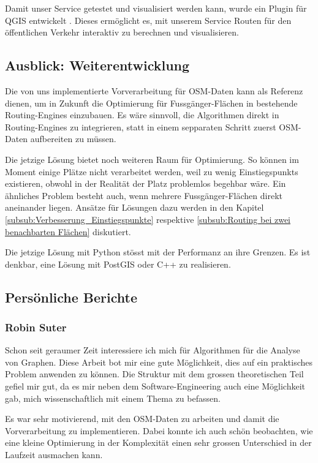 Damit unser Service getestet und visualisiert werden kann, wurde ein Plugin für QGIS entwickelt \cite{github:PlazaRoute-qgis-plugin}. Dieses ermöglicht es, mit unserem Service Routen für den öffentlichen Verkehr interaktiv zu berechnen und visualisieren.

\subsection{Ausblick: Weiterentwicklung}
\label{sub:Ausblick: Weiterentwicklung}

Die von uns implementierte Vorverarbeitung für \ac{OSM}-Daten kann als Referenz dienen, um in Zukunft die Optimierung für Fussgänger-Flächen in bestehende Routing-Engines einzubauen. Es wäre sinnvoll, die Algorithmen direkt in Routing-Engines zu integrieren, statt in einem sepparaten Schritt zuerst \ac{OSM}-Daten aufbereiten zu müssen.

Die jetzige Lösung bietet noch weiteren Raum für Optimierung. So können im Moment einige Plätze nicht verarbeitet werden, weil zu wenig \glspl{Einstiegspunkt} existieren, obwohl in der Realität der Platz problemlos begehbar wäre. Ein ähnliches Problem besteht auch, wenn mehrere Fussgänger-Flächen direkt aneinander liegen. Ansätze für Lösungen dazu werden in den Kapitel \ref{subsub:Verbesserung_Einstiegspunkte} respektive \ref{subsub:Routing bei zwei benachbarten Flächen} diskutiert.

Die jetzige Lösung mit Python stösst mit der Performanz an ihre Grenzen. Es ist denkbar, eine Lösung mit PostGIS oder C++ zu realisieren.

\subsection{Persönliche Berichte}
\label{sub:Persönliche Berichte}

\subsubsection{Robin Suter}
\label{Persönliche Berichte:Robin Suter}
Schon seit geraumer Zeit interessiere ich mich für Algorithmen für die Analyse von Graphen. Diese Arbeit bot mir eine gute Möglichkeit, dies auf ein praktisches Problem anwenden zu können. Die Struktur mit dem grossen theoretischen Teil gefiel mir gut, da es mir neben dem Software-Engineering auch eine Möglichkeit gab, mich wissenschaftlich mit einem Thema zu befassen.

Es war sehr motivierend, mit den \ac{OSM}-Daten zu arbeiten und damit die Vorverarbeitung zu implementieren. Dabei konnte ich auch schön beobachten, wie eine kleine Optimierung in der Komplexität einen sehr grossen Unterschied in der Laufzeit ausmachen kann.

